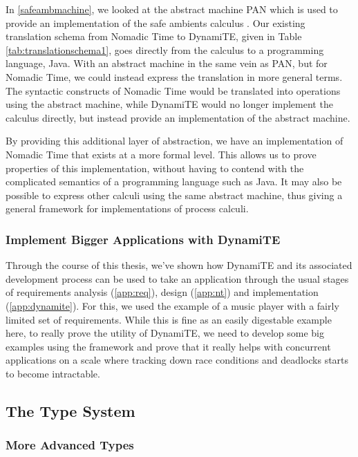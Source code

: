 In \ref{safeambmachine}, we looked at the abstract machine PAN which
is used to provide an implementation of the safe ambients calculus
\cite{sangiorgi:safeambientsmachine}.  Our existing translation schema
from Nomadic Time to DynamiTE, given in Table
\ref{tab:translationschema1}, goes directly from the calculus to a
programming language, Java.  With an abstract machine in the same vein
as PAN, but for Nomadic Time, we could instead express the translation
in more general terms.  The syntactic constructs of Nomadic Time would
be translated into operations using the abstract machine, while
DynamiTE would no longer implement the calculus directly, but instead
provide an implementation of the abstract machine.

By providing this additional layer of abstraction, we have an
implementation of Nomadic Time that exists at a more formal level.
This allows us to prove properties of this implementation, without
having to contend with the complicated semantics of a programming
language such as Java.  It may also be possible to express other
calculi using the same abstract machine, thus giving a general
framework for implementations of process calculi.

\subsubsection{Implement Bigger Applications with DynamiTE}

Through the course of this thesis, we've shown how DynamiTE and its
associated development process can be used to take an application
through the usual stages of requirements analysis (\ref{app:req}),
design (\ref{app:nt}) and implementation (\ref{app:dynamite}).  For
this, we used the example of a music player with a fairly limited set
of requirements.  While this is fine as an easily digestable example
here, to really prove the utility of DynamiTE, we need to develop some
big examples using the framework and prove that it really helps with
concurrent applications on a scale where tracking down race conditions
and deadlocks starts to become intractable.

\subsection{The Type System}
\label{future:types}

\subsubsection{More Advanced Types}

